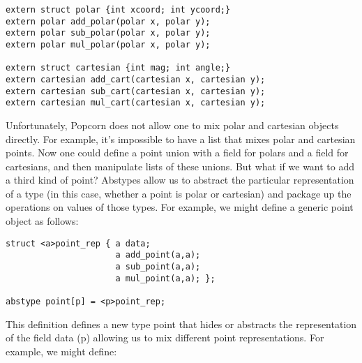 \documentclass[titlepage,10pt]{article}
\begin{document}
\begin{verbatim}
extern struct polar {int xcoord; int ycoord;}
extern polar add_polar(polar x, polar y);
extern polar sub_polar(polar x, polar y);
extern polar mul_polar(polar x, polar y);

extern struct cartesian {int mag; int angle;}
extern cartesian add_cart(cartesian x, cartesian y);
extern cartesian sub_cart(cartesian x, cartesian y);
extern cartesian mul_cart(cartesian x, cartesian y);
\end{verbatim}

Unfortunately, Popcorn does not allow one to mix polar and cartesian
objects directly.  For example, it's impossible to have a list that
mixes polar and cartesian points.  Now one could define a point union
with a field for polars and a field for cartesians, and then manipulate
lists of these unions.  But what if we want to add a third kind of
point?  Abstypes allow us to abstract the particular representation of a
type (in this case, whether a point is polar or cartesian) and package
up the operations on values of those types.  For example, we might
define a generic point object as follows:


\begin{verbatim}
struct <a>point_rep { a data; 
                      a add_point(a,a);
                      a sub_point(a,a);
                      a mul_point(a,a); };

abstype point[p] = <p>point_rep;
\end{verbatim}

This definition defines a new type point that hides or abstracts the
representation of the field data (p) allowing us to mix different point
representations.  For example, we might define:
\end{document}
